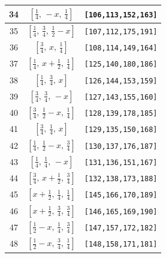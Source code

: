 \documentclass[fleqn,8pt]{jsarticle}
\begin{document}
\begin{longtable}{ccc}
34 & $\left[ \frac{1}{4},\, - x,\, \frac{1}{4} \right]$ & {\tt [106,113,152,163]} \\ \hline
35 & $\left[ \frac{1}{4},\, \frac{3}{4},\, \frac{1}{2} - x \right]$ & {\tt [107,112,175,191]} \\ \hline
36 & $\left[ \frac{3}{4},\, x,\, \frac{1}{4} \right]$ & {\tt [108,114,149,164]} \\ \hline
37 & $\left[ \frac{1}{4},\, x + \frac{1}{2},\, \frac{1}{4} \right]$ & {\tt [125,140,180,186]} \\ \hline
38 & $\left[ \frac{1}{4},\, \frac{3}{4},\, x \right]$ & {\tt [126,144,153,159]} \\ \hline
39 & $\left[ \frac{3}{4},\, \frac{3}{4},\, - x \right]$ & {\tt [127,143,155,160]} \\ \hline
40 & $\left[ \frac{3}{4},\, \frac{1}{2} - x,\, \frac{1}{4} \right]$ & {\tt [128,139,178,185]} \\ \hline
41 & $\left[ \frac{3}{4},\, \frac{1}{4},\, x \right]$ & {\tt [129,135,150,168]} \\ \hline
42 & $\left[ \frac{1}{4},\, \frac{1}{2} - x,\, \frac{3}{4} \right]$ & {\tt [130,137,176,187]} \\ \hline
43 & $\left[ \frac{1}{4},\, \frac{1}{4},\, - x \right]$ & {\tt [131,136,151,167]} \\ \hline
44 & $\left[ \frac{3}{4},\, x + \frac{1}{2},\, \frac{3}{4} \right]$ & {\tt [132,138,173,188]} \\ \hline
45 & $\left[ x + \frac{1}{2},\, \frac{1}{4},\, \frac{1}{4} \right]$ & {\tt [145,166,170,189]} \\ \hline
46 & $\left[ x + \frac{1}{2},\, \frac{3}{4},\, \frac{3}{4} \right]$ & {\tt [146,165,169,190]} \\ \hline
47 & $\left[ \frac{1}{2} - x,\, \frac{1}{4},\, \frac{3}{4} \right]$ & {\tt [147,157,172,182]} \\ \hline
48 & $\left[ \frac{1}{2} - x,\, \frac{3}{4},\, \frac{1}{4} \right]$ & {\tt [148,158,171,181]} \\
\end{longtable}
\renewcommand{\arraystretch}{1.2}
\end{document}
